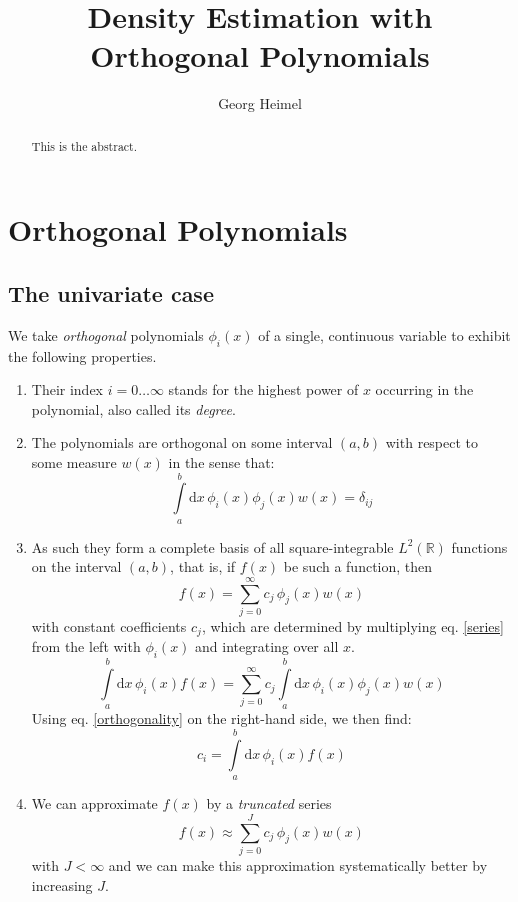 \documentclass[]{report}
\title{Density Estimation with Orthogonal Polynomials}
\author{Georg Heimel}
\begin{document}
\maketitle

\begin{abstract}
	This is the abstract.
\end{abstract}

\chapter{Orthogonal Polynomials}
	\section{The univariate case}
	We take \emph{orthogonal} polynomials $\phi_i(x)$ of a single, continuous variable to exhibit the following properties.
	\begin{enumerate}
		\item Their index $i=0\ldots\infty$ stands for the highest power of $x$ occurring in the polynomial, also called its \emph{degree}.
		\item The polynomials are orthogonal on some interval $(a, b)$ with respect to some measure $w(x)$ in the sense that:
		\begin{equation}\label{orthogonality}
			\int\limits_a^b\mathrm{d}x\,\phi_i(x)\phi_j(x)w(x) = \delta_{ij}
		\end{equation}
		\item As such they form a complete basis of all square-integrable $L^2(\mathbb{R})$ functions on the interval $(a, b)$, that is, if $f(x)$ be such a function, then
		\begin{equation}\label{series}
			f(x)=\sum_{j=0}^{\infty}c_j\,\phi_j(x)w(x)
		\end{equation}
		with constant coefficients $c_j$, which are determined by multiplying eq. \ref{series} from the left with $\phi_i(x)$ and integrating over all $x$.
		\begin{equation*}
			\int\limits_a^b\mathrm{d}x\,\phi_i(x)f(x) = \sum_{j=0}^{\infty}c_j\int\limits_a^b\mathrm{d}x\,\phi_i(x)\phi_j(x)w(x)
		\end{equation*}
		Using eq. \ref{orthogonality} on the right-hand side, we then find:
		\begin{equation}
			c_i=\int\limits_a^b\mathrm{d}x\,\phi_i(x)f(x)
		\end{equation}
		\item We can approximate $f(x)$ by a \emph{truncated} series
		\begin{equation}\label{trunc_series}
			f(x)\approx\sum_{j=0}^{J}c_j\,\phi_j(x)w(x)
		\end{equation}
		with $J < \infty$ and we can make this approximation systematically better by increasing $J$.
	\end{enumerate}
	
\end{document}
